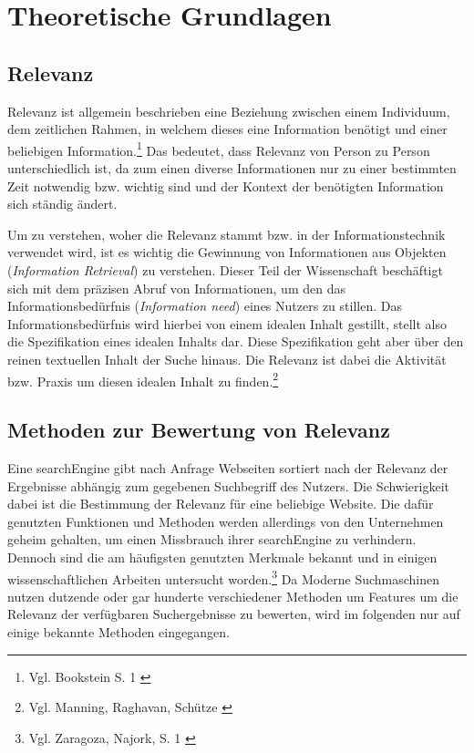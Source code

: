 \chapter{Theoretische Grundlagen}
\label{ch:grundlagen}

\section{Relevanz}

Relevanz ist allgemein beschrieben eine Beziehung zwischen einem Individuum, dem zeitlichen Rahmen, in welchem dieses eine Information benötigt und einer beliebigen Information.\footnote{Vgl. Bookstein S. 1 \cite{bookstein2007}}
Das bedeutet, dass Relevanz von Person zu Person unterschiedlich ist, da zum einen diverse Informationen nur zu einer bestimmten Zeit notwendig bzw. wichtig sind und der Kontext der benötigten Information sich ständig ändert.

Um zu verstehen, woher die Relevanz stammt bzw. in der Informationstechnik verwendet wird, ist es wichtig die Gewinnung von Informationen aus Objekten (\emph{Information Retrieval}) zu verstehen.
Dieser Teil der Wissenschaft beschäftigt sich mit dem präzisen Abruf von Informationen, um den das Informationsbedürfnis (\emph{Information need}) eines Nutzers zu stillen.
Das Informationsbedürfnis wird hierbei von einem idealen Inhalt gestillt, stellt also die Spezifikation eines idealen Inhalts dar. Diese Spezifikation geht aber über den reinen textuellen Inhalt der Suche hinaus. Die Relevanz ist dabei die Aktivität bzw. Praxis um diesen idealen Inhalt zu finden.\footnote{Vgl. Manning, Raghavan, Schütze \cite{manning2008}}

\section{Methoden zur Bewertung von Relevanz}

Eine \gls{searchEngine} gibt nach Anfrage Webseiten sortiert nach der Relevanz der Ergebnisse abhängig zum gegebenen Suchbegriff des Nutzers.
Die Schwierigkeit dabei ist die Bestimmung der Relevanz für eine beliebige Website.
Die dafür genutzten Funktionen und Methoden werden allerdings von den Unternehmen geheim gehalten, um einen Missbrauch ihrer \gls{searchEngine} zu verhindern.
Dennoch sind die am häufigsten genutzten Merkmale bekannt und in einigen wissenschaftlichen Arbeiten untersucht worden.\footnote{Vgl. Zaragoza, Najork, S. 1 \cite{zaragoza2018}}
Da Moderne Suchmaschinen nutzen dutzende oder gar hunderte verschiedener Methoden um Features um die Relevanz der verfügbaren Suchergebnisse zu bewerten, wird im folgenden nur auf einige bekannte Methoden eingegangen.

